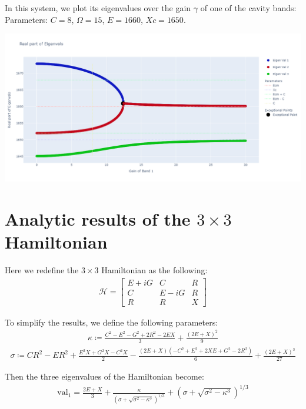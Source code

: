 \documentclass[1pt]{book}
\theoremstyle{break}
\theoremstyle{break}
\newcommand{\bmat}[1]{\begin{bmatrix} #1 \end{bmatrix}}
\begin{document}
\hfill\break\hfill\break
In this system, we plot its eigenvalues over the gain $\gamma$ of one of the cavity bands:\\

Parameters: $C = 8$, $\Omega = 15$, $E = 1660$, $Xc = 1650$. 
\begin{center}
\includegraphics[scale=0.29]{081510.png}
\end{center}


\newpage
\section{Analytic results of the $3\times 3$ Hamiltonian}
Here we redefine the $3\times 3$ Hamiltonian as the following:
\begin{align*}
\mathcal{H} = \bmat{E + iG & C & R \\
	  				C & E - iG & R \\
	  				R & R & X}
\end{align*}

To simplify the results, we define the following parameters:
\begin{align*}
\kappa \coloneqq \frac{C^2-E^2-G^2+2R^2-2EX}{3}+\frac{{\left(2E+X\right)}^2}{9}
\end{align*}
\begin{align*}
\sigma \coloneqq CR^2-ER^2+\frac{E^2X+G^2X-C^2X}{2}-\frac{\left(2E+X\right)\left(-C^2+E^2+2XE+G^2-2R^2\right)}{6}+\frac{{\left(2E+X\right)}^3}{27}
\end{align*}

\hfill\break
Then the three eigenvalues of the Hamiltonian become:
\begin{align*}
\text{val}_1=\frac{2E+X}{3}+\frac{\kappa}{{\left(\sigma+\sqrt{\sigma^2-\kappa^3}\right)}^{1/3}}+{\left(\sigma+\sqrt{{\sigma}^2-{\kappa}^3}\right)}^{1/3}
\end{align*}
\end{document}

